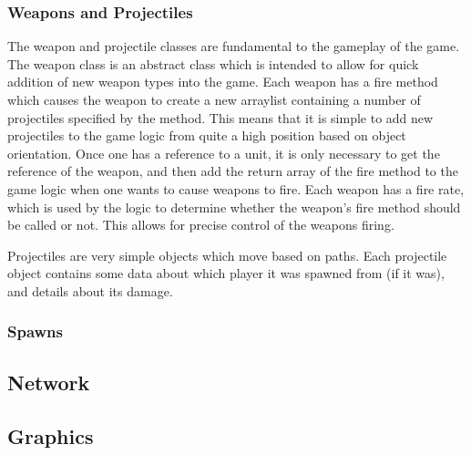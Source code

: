\subsubsection{Weapons and Projectiles}
The weapon and projectile classes are fundamental to the gameplay of the game. The weapon class is an abstract class which is intended to allow for quick addition of new weapon types into the game. Each weapon has a fire method which causes the weapon to create a new arraylist containing a number of projectiles specified by the method. This means that it is simple to add new projectiles to the game logic from quite a high position based on object orientation. Once one has a reference to a unit, it is only necessary to get the reference of the weapon, and then add the return array of the fire method to the game logic when one wants to cause weapons to fire. Each weapon has a fire rate, which is used by the logic to determine whether the weapon's fire method should be called or not. This allows for precise control of the weapons firing.

Projectiles are very simple objects which move based on paths. Each projectile object contains some data about which player it was spawned from (if it was), and details about its damage.
\subsubsection{Spawns}

\subsection{Network}
\subsection{Graphics}



